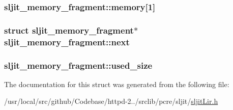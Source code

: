 \subsubsection[{\texorpdfstring{memory}{memory}}]{ sljit\+\_\+memory\+\_\+fragment\+::memory\mbox{[}1\mbox{]}}\hypertarget{structsljit__memory__fragment_a79350de8531fc96b9a3c9c741dc7da05}{}\label{structsljit__memory__fragment_a79350de8531fc96b9a3c9c741dc7da05}
\subsubsection[{\texorpdfstring{next}{next}}]{\setlength{\rightskip}{0pt plus 5cm}struct {\bf sljit\+\_\+memory\+\_\+fragment}$\ast$ sljit\+\_\+memory\+\_\+fragment\+::next}\hypertarget{structsljit__memory__fragment_af58bda985c6e8f5ff1f8d293ccfcb03c}{}\label{structsljit__memory__fragment_af58bda985c6e8f5ff1f8d293ccfcb03c}
\subsubsection[{\texorpdfstring{used\+\_\+size}{used_size}}]{ sljit\+\_\+memory\+\_\+fragment\+::used\+\_\+size}\hypertarget{structsljit__memory__fragment_a237fe02fd449b7fb79786a9f5d2185d3}{}\label{structsljit__memory__fragment_a237fe02fd449b7fb79786a9f5d2185d3}


The documentation for this struct was generated from the following file\+:\begin{DoxyCompactItemize}
\item 
/usr/local/src/github/\+Codebase/httpd-\/2../srclib/pcre/sljit/\hyperlink{sljitLir_8h}{sljit\+Lir.\+h}\end{DoxyCompactItemize}

